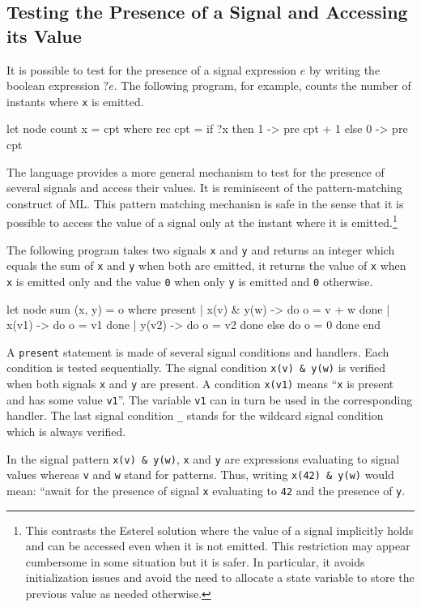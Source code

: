 \documentclass[11pt,titlepage,twoside]{report}
\newcommand{\esterel}{{\sf Esterel}}
\begin{document}
\subsection{Testing the Presence of a Signal and Accessing its Value}
It is possible to test for the presence of a signal expression $e$ by
writing the boolean expression $? e$. The following program, for
example, counts the number of instants where \verb-x- is emitted.
\begin{runverbatim}[withresult]
let node count x = cpt where
  rec cpt = if ?x then 1 -> pre cpt + 1 else 0 -> pre cpt
\end{runverbatim}

The language provides a more general mechanism to test for the
presence of several signals and access their values. It is reminiscent
of the pattern-matching construct of ML.  This pattern matching
mechanisn is safe in the sense that it is possible to access the value
of a signal only at the instant where it is emitted.\footnote{This
  contrasts the \esterel{} solution where the value of a signal
  implicitly holds and can be accessed even when it is not
  emitted. This restriction may appear cumbersome in some situation
  but it is safer. In particular, it avoids initialization issues and
  avoid the need to allocate a state variable to store the previous
  value as needed otherwise.}

The following program takes two signals \verb-x- and \verb-y- and
returns an integer which equals the sum of \verb-x- and \verb-y- when
both are emitted, it returns the value of \verb-x- when \verb-x- is
emitted only and the value \verb-0- when only \verb-y- is emitted and
\verb-0- otherwise.
\begin{runverbatim}[withresult]
let node sum (x, y) = o where
  present
  | x(v) & y(w) -> do o = v + w done
  | x(v1) -> do o = v1 done
  | y(v2) -> do o = v2 done
  else do o = 0 done
  end
\end{runverbatim}
A \verb-present- statement is made of several signal conditions and
handlers. Each condition is tested sequentially. The signal condition
\verb-x(v) & y(w)- is verified when both signals \verb-x- and \verb-y-
are present. A condition \verb-x(v1)- means ``\verb-x- is present and
has some value \verb-v1-''. The variable \verb-v1- can in turn be used
in the corresponding handler. The last signal condition \verb-_-
stands for the wildcard signal condition which is always verified.

In the signal pattern \verb-x(v) & y(w)-, \verb-x- and \verb-y- are
expressions evaluating to signal values whereas \verb-v- and \verb-w-
stand for patterns. Thus, writing \verb-x(42) & y(w)- would mean:
``await for the presence of signal \verb-x- evaluating to \verb-42-
and the presence of \verb-y-.
\end{document}
